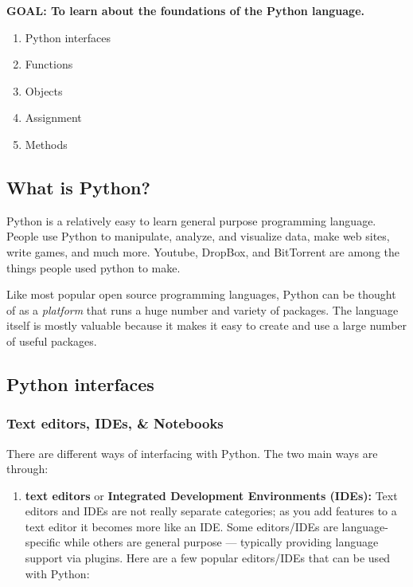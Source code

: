 \documentclass[]{book}
\providecommand{\tightlist}{%
  \setlength{\itemsep}{0pt}\setlength{\parskip}{0pt}}
\begin{document}
\textbf{GOAL: To learn about the foundations of the Python language.}

\begin{enumerate}
\def\labelenumi{\arabic{enumi}.}
\tightlist
\item
  Python interfaces
\item
  Functions
\item
  Objects
\item
  Assignment
\item
  Methods
\end{enumerate}

\hypertarget{what-is-python}{%
\subsection{What is Python?}\label{what-is-python}}

Python is a relatively easy to learn general purpose programming language. People use Python to manipulate, analyze, and visualize data, make web sites, write games, and much more. Youtube, DropBox, and BitTorrent are among the things people used python to make.

Like most popular open source programming languages, Python can be thought of as a \emph{platform} that runs a huge number and variety of packages. The language itself is mostly valuable because it makes it easy to create and use a large number of useful packages.

\hypertarget{python-interfaces}{%
\subsection{Python interfaces}\label{python-interfaces}}

\hypertarget{text-editors-ides-notebooks-1}{%
\subsubsection{Text editors, IDEs, \& Notebooks}\label{text-editors-ides-notebooks-1}}

There are different ways of interfacing with Python. The two main ways are through:

\begin{enumerate}
\def\labelenumi{\arabic{enumi}.}
\tightlist
\item
  \textbf{text editors} or \textbf{Integrated Development Environments (IDEs):} Text editors and IDEs are not really separate categories; as you add features to a text editor it becomes more like an IDE. Some editors/IDEs are language-specific while others are general purpose --- typically providing language support via plugins. Here are a few popular editors/IDEs that can be used with Python:
\end{enumerate}
\end{document}
